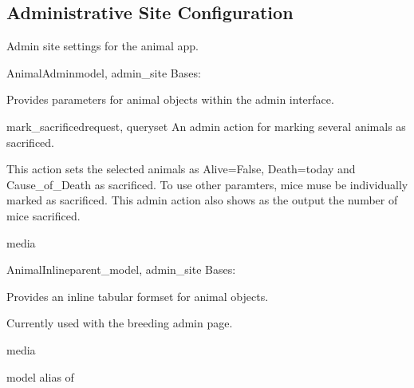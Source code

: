\documentclass[letterpaper,10pt,english]{sphinxmanual}
\begin{document}
\subsection{Administrative Site Configuration}
\hypertarget{module-animal.admin}{}
\modulesynopsis{}
Admin site settings for the animal app.

\hypertarget{animal.admin.AnimalAdmin}{}\begin{classdesc}{AnimalAdmin}{model, admin\_site}
Bases: 

Provides parameters for animal objects within the admin interface.

\hypertarget{animal.admin.AnimalAdmin.mark\_sacrificed}{}\begin{methoddesc}{mark\_sacrificed}{request, queryset}
An admin action for marking several animals as sacrificed.

This action sets the selected animals as Alive=False, Death=today and Cause\_of\_Death as sacrificed.  To use other paramters, mice muse be individually marked as sacrificed.
This admin action also shows as the output the number of mice sacrificed.
\end{methoddesc}

\hypertarget{animal.admin.AnimalAdmin.media}{}\begin{memberdesc}{media}\end{memberdesc}
\end{classdesc}

\hypertarget{animal.admin.AnimalInline}{}\begin{classdesc}{AnimalInline}{parent\_model, admin\_site}
Bases: 

Provides an inline tabular formset for animal objects.

Currently used with the breeding admin page.

\hypertarget{animal.admin.AnimalInline.media}{}\begin{memberdesc}{media}\end{memberdesc}

\hypertarget{animal.admin.AnimalInline.model}{}\begin{memberdesc}{model}
alias of 
\end{memberdesc}
\end{classdesc}
\end{document}
